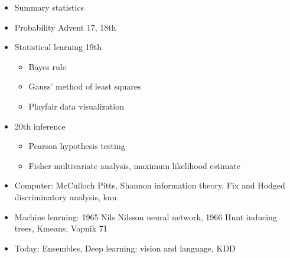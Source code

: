 \begin{itemize}
  \item Summary statistics
  \item Probability Advent 17, 18th
  \item Statistical learning 19th
    \begin{itemize}
      \item Bayes rule
      \item Gauss’ method of least squares
      \item Playfair data visualization
    \end{itemize}
  \item 20th inference
    \begin{itemize}
      \item Pearson hypothesis testing
      \item Fisher multivariate analysis, maximum likelihood estimate
    \end{itemize}
  \item Computer: McCulloch Pitts, Shannon information theory, Fix and Hodged discriminatory analysis, knn
  \item Machine learning: 1965 Nils Nilsson neural network, 1966 Hunt inducing trees, Kmeans, Vapnik 71
  \item Today: Ensembles, Deep learning: vision and language, KDD
\end{itemize}
